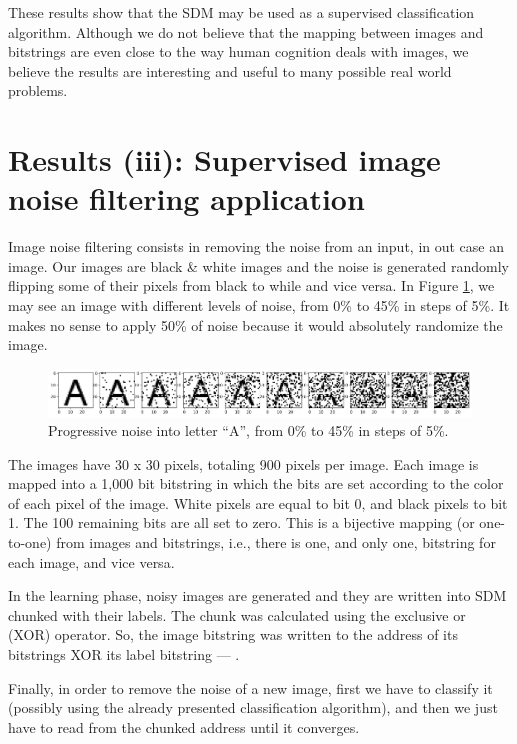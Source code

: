 These results show that the SDM may be used as a supervised classification algorithm. Although we do not believe that the mapping between images and bitstrings are even close to the way human cognition deals with images, we believe the results are interesting and useful to many possible real world problems.


\section{Results (iii): Supervised image noise filtering application}

Image noise filtering consists in removing the noise from an input, in out case an image. Our images are black \& white images and the noise is generated randomly flipping some of their pixels from black to while and vice versa. In Figure \ref{fig-filter-progressive-noise}, we may see an image with different levels of noise, from 0\% to 45\% in steps of 5\%. It makes no sense to apply 50\% of noise because it would absolutely randomize the image.

\begin{figure}[!htb]
\centering\includegraphics[width=\textwidth]{./images02/filter/progressive-noise.png}
\caption{Progressive noise into letter ``A'', from 0\% to 45\% in steps of 5\%.
\label{fig-filter-progressive-noise}}
\end{figure}

The images have 30 x 30 pixels, totaling 900 pixels per image. Each image is mapped into a 1,000 bit bitstring in which the bits are set according to the color of each pixel of the image. White pixels are equal to bit 0, and black pixels to bit 1. The 100 remaining bits are all set to zero. This is a bijective mapping (or one-to-one) from images and bitstrings, i.e., there is one, and only one, bitstring for each image, and vice versa.

In the learning phase, noisy images are generated and they are written into SDM chunked with their labels. The chunk was calculated using the exclusive or (XOR) operator. So, the image bitstring was written to the address of its bitstrings XOR its label bitstring --- .

Finally, in order to remove the noise of a new image, first we have to classify it (possibly using the already presented classification algorithm), and then we just have to read from the chunked address until it converges.



